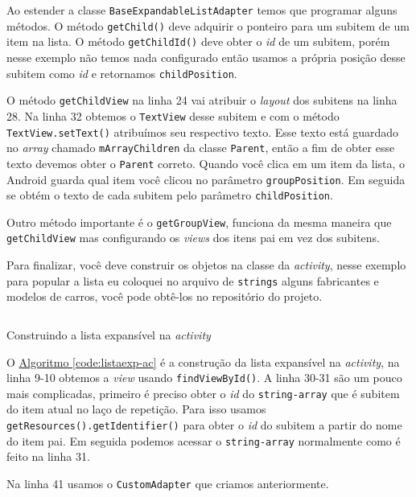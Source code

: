 \documentclass[a4paper,12pt,brazil,oneside]{book}
\begin{document}
Ao estender a classe \texttt{BaseExpandableListAdapter} temos que programar alguns métodos. O método \texttt{getChild()} deve adquirir o ponteiro para um subitem de um item na lista. O método \texttt{getChildId()} deve obter o \emph{id} de um subitem, porém nesse exemplo não temos nada configurado então usamos a própria posição desse subitem como \emph{id} e retornamos \texttt{childPosition}. 

O método \texttt{getChildView} na linha 24 vai atribuir o \emph{layout} dos subitens na linha 28. Na linha 32 obtemos o \texttt{TextView} desse subitem e com o método \texttt{TextView.setText()} atribuímos seu respectivo texto. Esse texto está guardado no \emph{array} chamado \texttt{mArrayChildren} da classe \texttt{Parent}, então a fim de obter esse texto devemos obter o \texttt{Parent} correto. Quando você clica em um item da lista, o Android guarda qual item você clicou no parâmetro \texttt{groupPosition}. Em seguida se obtém o texto de cada subitem pelo parâmetro \texttt{childPosition}.

Outro método importante é o \texttt{getGroupView}, funciona da mesma maneira que \texttt{getChildView} mas configurando os \emph{views} dos itens pai em vez dos subitens.

Para finalizar, você deve construir os objetos na classe da \emph{activity}, nesse exemplo para popular a lista eu coloquei no arquivo de \texttt{strings} alguns fabricantes e modelos de carros, você pode obtê-los no repositório do projeto.

\begin{listing}[H]
\inputminted[linenos=true,fontsize=\small,frame=lines, framesep=2mm, tabsize=2,numbersep=5pt]{java}{src/design/exlist-main.java}
\caption{Construindo a lista expansível na \emph{activity}}
\label{code:listaexp-ac}
\end{listing}	

\newpage

O \hyperref[code:listaexp-ac]{Algoritmo \ref*{code:listaexp-ac}} é a construção da lista expansível na \emph{activity}, na linha 9-10 obtemos a \emph{view} usando \texttt{findViewById()}. A linha 30-31 são um pouco mais complicadas, primeiro é preciso obter o \emph{id} do \texttt{string-array} que é subitem do item atual no laço de repetição. Para isso usamos \texttt{getResources().getIdentifier()} para obter o \emph{id} do subitem a partir do nome do item pai. Em seguida podemos acessar o \texttt{string-array} normalmente como é feito na linha 31.

 Na linha 41 usamos o \texttt{CustomAdapter} que criamos anteriormente.
\end{document}
